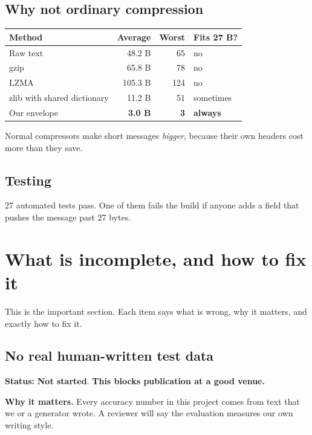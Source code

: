 \documentclass[11pt,a4paper]{article}
\newcommand{\todo}{\textcolor{bad}{\textbf{Not started}}}
\begin{document}
\subsection{Why not ordinary compression}

\begin{center}
\begin{tabular}{lrrl}
\toprule
\textbf{Method} & \textbf{Average} & \textbf{Worst} & \textbf{Fits 27 B?} \\
\midrule
Raw text & 48.2 B & 65 & no \\
gzip & 65.8 B & 78 & no \\
LZMA & 105.3 B & 124 & no \\
zlib with shared dictionary & 11.2 B & 51 & sometimes \\
Our envelope & \textbf{3.0 B} & \textbf{3} & \textbf{always} \\
\bottomrule
\end{tabular}
\end{center}

Normal compressors make short messages \emph{bigger}, because their own
headers cost more than they save.

\subsection{Testing}

27 automated tests pass. One of them fails the build if anyone adds a field
that pushes the message past 27 bytes.

\section{What is incomplete, and how to fix it}

This is the important section. Each item says what is wrong, why it matters,
and exactly how to fix it.

\subsection{No real human-written test data}

\textbf{Status:} \todo. \textbf{This blocks publication at a good venue.}

\textbf{Why it matters.} Every accuracy number in this project comes from text
that we or a generator wrote. A reviewer will say the evaluation measures our
own writing style.
\end{document}
